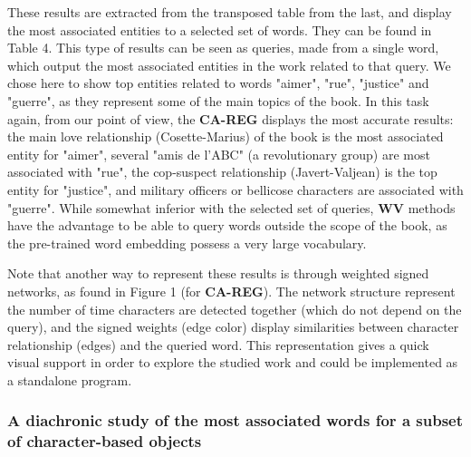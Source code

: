 \documentclass[
twocolumn,
]{ceurart}
\begin{document}
These results are extracted from the transposed table from the last, and display the most associated entities to a selected set of words. They can be found in Table 4. This type of results can be seen as queries, made from a single word, which output the most associated entities in the work related to that query. We chose here to show top entities related to words "aimer", "rue", "justice" and "guerre", as they represent some of the main topics of the book. In this task again, from our point of view, the \textbf{CA-REG} displays the most accurate results: the main love relationship (Cosette-Marius) of the book is the most associated entity for "aimer", several "amis de l'ABC" (a revolutionary group) are most associated with "rue", the cop-suspect relationship (Javert-Valjean) is the top entity for "justice", and military officers or bellicose characters are associated with "guerre". While somewhat inferior with the selected set of queries, \textbf{WV} methods have the advantage to be able to query words outside the scope of the book, as the pre-trained word embedding possess a very large vocabulary.

Note that another way to represent these results is through weighted signed networks, as found in Figure 1 (for \textbf{CA-REG}). The network structure represent the number of time characters are detected together (which do not depend on the query), and the signed weights (edge color) display similarities between character relationship (edges) and the queried word. This representation gives a quick visual support in order to explore the studied work and could be implemented as a standalone program.


\subsubsection{A diachronic study of the most associated words for a subset of character-based objects}
\label{diachronic}
\end{document}
